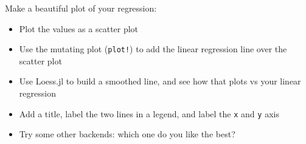 \documentclass[11pt]{article}
\begin{document}
Make a beautiful plot of your regression:

\begin{itemize}
\itemsep1pt\parskip0pt
\item
  Plot the values as a scatter plot
\item
  Use the mutating plot (\texttt{plot!}) to add the linear regression
  line over the scatter plot
\item
  Use Loess.jl to build a smoothed line, and see how that plots vs your
  linear regression
\item
  Add a title, label the two lines in a legend, and label the \texttt{x}
  and \texttt{y} axis
\item
  Try some other backends: which one do you like the best?
\end{itemize}


    
    
    
    
\end{document}
